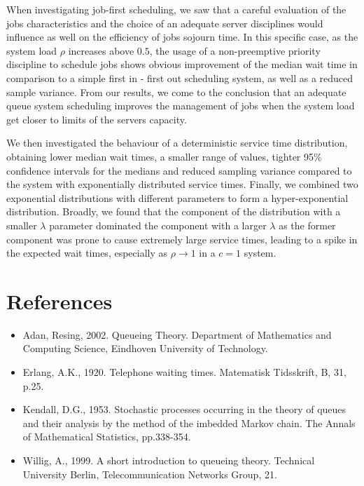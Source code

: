 \documentclass{article}
\begin{document}
    When investigating job-first scheduling, we saw that a careful evaluation of the jobs characteristics and the choice of an adequate server disciplines  would influence as well on the efficiency of jobs sojourn time. In this specific case, as the system load $\rho$ increases above $0.5$, the usage of a non-preemptive priority discipline to schedule jobs shows obvious improvement of the median wait time in comparison to a simple first in - first out scheduling system, as well as a reduced sample variance. From our results, we come to the conclusion that an adequate queue system scheduling improves the management of jobs when the system load get closer to limits of the servers capacity.

    We then investigated the behaviour of a deterministic service time distribution, obtaining lower median wait times, a smaller range of values, tighter 95\% confidence intervals for the medians and reduced sampling variance compared to the system with exponentially distributed service times. Finally, we combined two exponential distributions with different parameters to form a hyper-exponential distribution. Broadly, we found that the component of the distribution with a smaller $\lambda$ parameter dominated the component with a larger $\lambda$ as the former component was prone to cause extremely large service times, leading to a spike in the expected wait times, especially as $\rho \rightarrow{1}$ in a $c = 1$ system.


    \clearpage

    \section*{References}

    \begin{itemize}
        \item[] Adan, Resing, 2002. Queueing Theory. Department of Mathematics and Computing Science, Eindhoven University of Technology.
        \item[] Erlang, A.K., 1920. Telephone waiting times. Matematisk Tidsskrift, B, 31, p.25.
        \item[] Kendall, D.G., 1953. Stochastic processes occurring in the theory of queues and their analysis by the method of the imbedded Markov chain. The Annals of Mathematical Statistics, pp.338-354.
        \item[] Willig, A., 1999. A short introduction to queueing theory. Technical University Berlin, Telecommunication Networks Group, 21.
    \end{itemize}

    \clearpage
\end{document}
